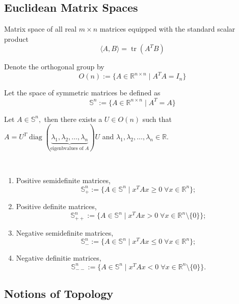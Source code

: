 \documentclass{tufte-handout}
\begin{document}
\subsection{Euclidean Matrix Spaces}%
  \label{sub:Euclidian Matrix Spaces}
  Matrix space of all real $m\times n$ matrices equipped with the standard scalar product
  $$\langle A, B\rangle = \operatorname{tr} (A^TB) $$
  \begin{definition}
    Denote the orthogonal group by $$O(n) := \{A \in \mathbb{R}^{n\times n} \mid A^TA = I_{n}\} $$
  \end{definition}
  \begin{definition}
    Let the space of symmetric matrices be defined as 
    $$\mathbb{S}^n := \{ A \in \mathbb{R}^{n\times n} \mid A^T = A \} $$
  \end{definition}
  \begin{theorem} \label{label}
    Let $A \in \mathbb{S}^n,$ then there exists a $U \in O(n)$ such that $A= U^T \operatorname{diag}(\underbrace{\lambda_1, \lambda_2, \hdots , \lambda_n}_{\text{eigenbvalues of }A})U$ and $\lambda_1, \lambda_2, \hdots , \lambda_n\in \mathbb{R}.$ 
  \end{theorem}
  \begin{example}$  $
    \begin{enumerate}
      \item Positive semidefinite matrices, $$\mathbb{S}^n_+ := \{A \in \mathbb{S}^n \mid x^T A x \geq 0 \; \forall x \in \mathbb{R}^n\};$$
      \item Positive definite matrices, $$\mathbb{S}^n_{++} := \{A \in \mathbb{S}^n \mid x^T A x > 0 \; \forall x \in \mathbb{R}^n\setminus\{0\}\};$$
      \item Negative semidefinite matrices, $$\mathbb{S}^n_- := \{A \in \mathbb{S}^n \mid x^T A x \leq 0 \; \forall x \in \mathbb{R}^n\};$$
      \item Negative definitie matrices, $$\mathbb{S}^n_{--} := \{A \in \mathbb{S}^n \mid x^T A x < 0 \; \forall x \in \mathbb{R}^n\setminus \{0\}\}.$$
    \end{enumerate}
    
  \end{example}
  \subsection{Notions of Topology}%
    \label{sub:Notions of Topology}
    
\end{document}
